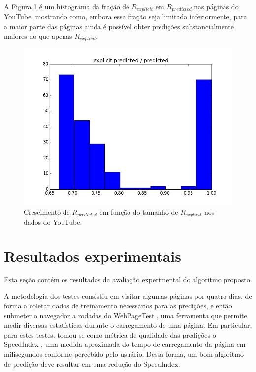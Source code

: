 \documentclass[10pt,twocolumn,letterpaper]{article}
\begin{document}
A Figura \ref{fig-youtube-explicit-predicted-over-predicted} é um histograma da fração de $R_{explicit}$ em $R_{predicted}$ nas páginas do YouTube, mostrando como, embora essa fração seja limitada inferiormente, para a maior parte das páginas ainda é possível obter predições substancialmente maiores do que apenas $R_{explicit}$. 

\begin{figure}
	\begin{center}
     \includegraphics[width=0.99\columnwidth]{pics/youtube_explicit_predicted_over_predicted.png}
    \caption{Crescimento de $R_{predicted}$ em função do tamanho de $R_{explicit}$ nos dados do YouTube.}
    \label{fig-youtube-explicit-predicted-over-predicted}   
	\end{center} 
\end{figure}

\section{Resultados experimentais}
\label{sec-experiments}

Esta seção contém os resultados da avaliação experimental do algoritmo proposto.

A metodologia dos testes consistiu em visitar algumas páginas por quatro dias, de forma a coletar dados de treinamento necessários para as predições, e então submeter o navegador a rodadas do WebPageTest \cite{WebPageTest:2013:Online}, uma ferramenta que permite medir diversas estatísticas durante o carregamento de uma página. Em particular, para estes testes, tomou-se como métrica de qualidade das predições o SpeedIndex \cite{SpeedIndex:2013:Online}, uma medida aproximada do tempo de carregamento da página em milisegundos conforme percebido pelo usuário. Dessa forma, um bom algoritmo de predição deve resultar em uma redução do SpeedIndex.
\end{document}
